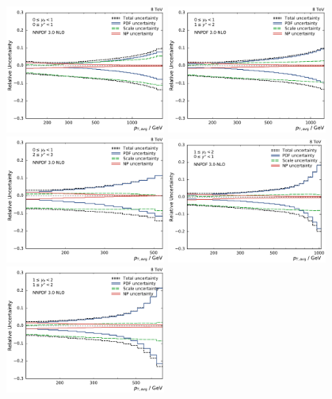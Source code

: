 \begin{figure}[htp]
    \centering
    \includegraphics[width=0.47\textwidth]{figures/theory/theo_unc_overview_yb0ys0.pdf}\hfill
    \includegraphics[width=0.47\textwidth]{figures/theory/theo_unc_overview_yb0ys1.pdf}
    \includegraphics[width=0.47\textwidth]{figures/theory/theo_unc_overview_yb0ys2.pdf}\hfill
    \includegraphics[width=0.47\textwidth]{figures/theory/theo_unc_overview_yb1ys0.pdf}
    \includegraphics[width=0.47\textwidth]{figures/theory/theo_unc_overview_yb1ys1.pdf}\hfill

\end{figure}
